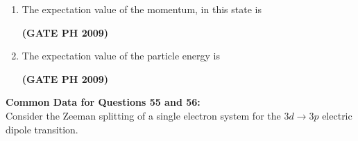 \documentclass[14pt, a4paper]{extarticle}
\begin{document}
\begin{enumerate}[label=\textbf{Q. \arabic*}, start=53]

\item The expectation value of the momentum, in this state is
\begin{enumerate}
\end{enumerate}
\hfill \textbf{(GATE PH 2009)}

\item The expectation value of the particle energy is
\begin{enumerate}
\end{enumerate}
\hfill \textbf{(GATE PH 2009)}

\end{enumerate}

\vspace{1.5em}
\noindent
\textbf{Common Data for Questions 55 and 56:} \\
Consider the Zeeman splitting of a single electron system for the $3d \rightarrow 3p$ electric dipole transition.
\end{document}
